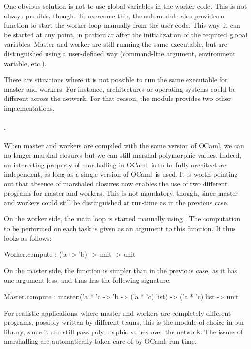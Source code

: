 \documentclass[tfpsymp,pagenumbers]{tfp07symp}
\newcommand{\Ocaml}{OCaml}
\begin{document}
  One obvious solution is not to use global variables in the worker
  code. This is not always possible, though.  To overcome this, the
   sub-module also provides a  function to
  start the worker loop manually from the user code. This way, it can
  be started at any point, in particular after the initialization of
  the required global variables.  Master and worker are still running
  the same executable, but are distinguished using a user-defined way
  (command-line argument, environment variable, etc.).

  \bigskip There are situations where it is not possible to run the
  same executable for master and workers.  For instance, architectures
  or operating systems could be different across the network.  For
  that reason, the  module provides two other
  implementations.

  \paragraph{.} When master and workers are compiled with the
  same version of \Ocaml, we can no longer marshal closures but we can
  still marshal polymorphic values. Indeed, an interesting property of
  marshalling in \Ocaml\ is to be fully architecture-independent, as
  long as a single version of \Ocaml\ is used. It is worth pointing
  out that absence of marshaled closures now enables the use of two
  different programs for master and workers. This is not mandatory,
  though, since master and workers could still be distinguished at
  run-time as in the previous case.

  On the worker side, the main loop is started manually using
  . The computation to be performed on each task is
  given as an argument to this function. It thus looks as follows:
  \begin{ocaml}
    Worker.compute : ('a -> 'b) -> unit -> unit
  \end{ocaml}
  On the master side, the  function is simpler than in the
  previous case, as it has one argument less, and thus has the
  following signature.
  \begin{ocaml}
    Master.compute : master:('a * 'c -> 'b -> ('a * 'c) list) -> ('a *
    'c) list -> unit
  \end{ocaml}
  For realistic applications, where master and workers are completely
  different programs, possibly written by different teams, this is the
  module of choice in our library, since it can still pass polymorphic
  values over the network. The issues of marshalling are automatically
  taken care of by \Ocaml\ run-time.
\end{document}
